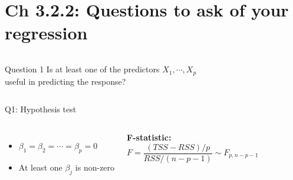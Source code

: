 \documentclass[aspectratio=169,usenames,dvipsnames]{beamer}
\newcommand{\InstructorList}[1]{
\begin{itemize}
	\color{orange}
	#1
\end{itemize}
}
\renewcommand{\InstructorList}[1]{}
\begin{document}
\section{Ch 3.2.2: Questions to ask of your regression}

\begin{frame}

\begin{columns}
\centering
\begin{block}
	{Question 1}
	\centering 
Is at least one of the predictors $X_1, \cdots, X_p$ \\
useful in predicting the response?
\end{block}

\end{columns}

\end{frame}
\begin{frame}[t]{Q1: Hypothesis test}

\begin{columns}
\centering
\begin{itemize}
	\item [$H_0 : $] $\beta_1 = \beta_2 = \cdots = \beta_p = 0$
	\item [$H_a:$] At least one $\beta_j$ is non-zero
\end{itemize}

\centering

\textbf{F-statistic:}
\begin{equation*}
	F = \frac{(TSS-RSS)/p}{RSS/(n-p-1)} \sim F_{p,n- p - 1}
\end{equation*}

\InstructorList{
\item TSS $= \sum_i (y_i - \overline y)^2$
\item RSS $= \sum_i (y_i - \hat y_i)^2$
}

\end{columns}

\end{frame}
\end{document}
